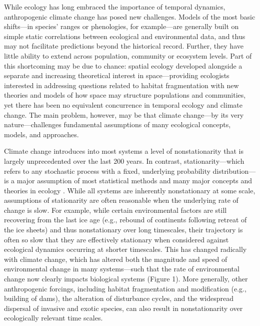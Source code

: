 \documentclass[11pt,a4paper,oneside]{article}
\begin{document}
\noindent While ecology has long embraced the importance of temporal dynamics, anthropogenic climate change has posed new challenges. Models of the most basic shifts---in species' ranges or phenologies, for example---are generally built on simple static correlations between ecological and environmental data, and thus may not facilitate predictions beyond the historical record. Further, they have little ability to extend across population, community or ecosystem levels. Part of this shortcoming may be due to chance: spatial ecology developed alongside a separate and increasing theoretical interest in space---providing ecologists interested in addressing questions related to habitat fragmentation with new theories and models of how space may structure populations and communities, yet there has been no equivalent concurrence in temporal ecology and climate change. The main problem, however, may be that climate change---by its very nature---challenges fundamental assumptions of many ecological concepts, models, and approaches. 

Climate change introduces into most systems a level of nonstationarity that is largely unprecedented over the last 200 years. In contrast, stationarity---which refers to any stochastic process with a fixed, underlying probability distribution---is a major assumption of most statistical methods and many major concepts and theories in ecology \citep{julio2012}. While all systems are inherently nonstationary at some scale, assumptions of stationarity are often reasonable when the underlying rate of change is slow. For example, while certain environmental factors are still recovering from the last ice age (e.g., rebound of continents following retreat of the ice sheets) and thus nonstationary over long timescales, their trajectory is often so slow that they are effectively stationary when considered against ecological dynamics occurring at shorter timescales. This has changed radically with climate change, which has altered both the magnitude and speed of environmental change in many systems---such that the rate of environmental change now clearly impacts biological systems (Figure 1). More generally, other anthropogenic forcings, including habitat fragmentation and modification (e.g., building of dams), the alteration of disturbance cycles, and the widespread dispersal of invasive and exotic species, can also result in nonstationarity over ecologically relevant time scales.
\end{document}
